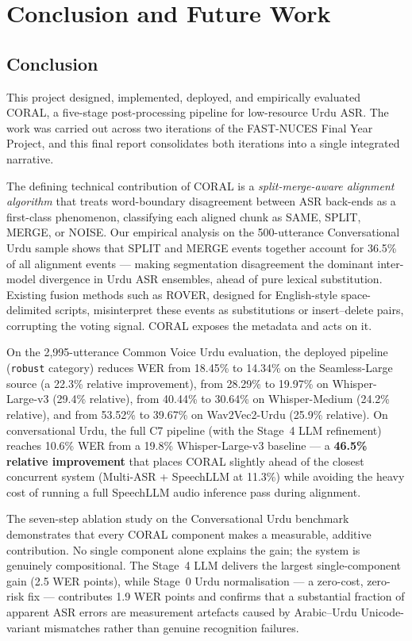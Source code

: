 \chapter{Conclusion and Future Work}
\label{chap:conclusion}

\section{Conclusion}
\label{sec:conclusion}

This project designed, implemented, deployed, and empirically evaluated CORAL, a five-stage post-processing pipeline for low-resource Urdu ASR. The work was carried out across two iterations of the FAST-NUCES Final Year Project, and this final report consolidates both iterations into a single integrated narrative.

The defining technical contribution of CORAL is a \emph{split-merge-aware alignment algorithm} that treats word-boundary disagreement between ASR back-ends as a first-class phenomenon, classifying each aligned chunk as SAME, SPLIT, MERGE, or NOISE. Our empirical analysis on the 500-utterance Conversational Urdu sample shows that SPLIT and MERGE events together account for 36.5\% of all alignment events --- making segmentation disagreement the dominant inter-model divergence in Urdu ASR ensembles, ahead of pure lexical substitution. Existing fusion methods such as ROVER, designed for English-style space-delimited scripts, misinterpret these events as substitutions or insert--delete pairs, corrupting the voting signal. CORAL exposes the metadata and acts on it.

On the 2{,}995-utterance Common Voice Urdu evaluation, the deployed pipeline (\texttt{robust} category) reduces WER from 18.45\% to 14.34\% on the Seamless-Large source (a 22.3\% relative improvement), from 28.29\% to 19.97\% on Whisper-Large-v3 (29.4\% relative), from 40.44\% to 30.64\% on Whisper-Medium (24.2\% relative), and from 53.52\% to 39.67\% on Wav2Vec2-Urdu (25.9\% relative). On conversational Urdu, the full C7 pipeline (with the Stage~4 LLM refinement) reaches 10.6\% WER from a 19.8\% Whisper-Large-v3 baseline --- a \textbf{46.5\% relative improvement} that places CORAL slightly ahead of the closest concurrent system (Multi-ASR + SpeechLLM at 11.3\%) while avoiding the heavy cost of running a full SpeechLLM audio inference pass during alignment.

The seven-step ablation study on the Conversational Urdu benchmark demonstrates that every CORAL component makes a measurable, additive contribution. No single component alone explains the gain; the system is genuinely compositional. The Stage~4 LLM delivers the largest single-component gain (2.5 WER points), while Stage~0 Urdu normalisation --- a zero-cost, zero-risk fix --- contributes 1.9 WER points and confirms that a substantial fraction of apparent ASR errors are measurement artefacts caused by Arabic--Urdu Unicode-variant mismatches rather than genuine recognition failures.

